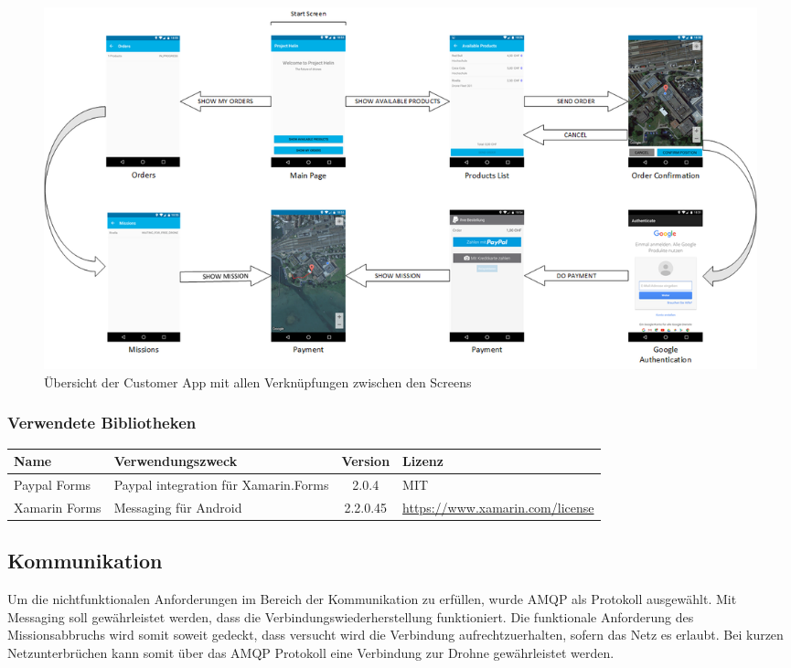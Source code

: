 \begin{landscape}
	\begin{figure}[h]
		\centering
		\includegraphics[width=0.8\paperheight] {images/customer-app-pages.png}
		\caption{Übersicht der Customer App mit allen Verknüpfungen zwischen den Screens}
		\label{fig:customer-app-flow}
	\end{figure}
\end{landscape}

\subsubsection{Verwendete Bibliotheken}
\begin{tabularx}{\textwidth}{|X|X|c|X|}
	\hline
	\textbf{Name} & \textbf{Verwendungszweck} & \textbf{Version} & \textbf{Lizenz} \\
	\hline \hline
	Paypal Forms & Paypal integration für Xamarin.Forms & 2.0.4 & MIT \\
	\hline 
	Xamarin Forms & Messaging für Android & 2.2.0.45 & \url{https://www.xamarin.com/license} \\
	\hline 
\end{tabularx}


\subsection{Kommunikation}
Um die nichtfunktionalen Anforderungen im Bereich der Kommunikation zu erfüllen, wurde AMQP als Protokoll ausgewählt. Mit Messaging soll gewährleistet werden, dass die Verbindungswiederherstellung funktioniert. Die funktionale Anforderung des Missionsabbruchs wird somit soweit gedeckt, dass versucht wird die Verbindung aufrechtzuerhalten, sofern das Netz es erlaubt. Bei kurzen Netzunterbrüchen kann somit über das AMQP Protokoll eine Verbindung zur Drohne gewährleistet werden.

